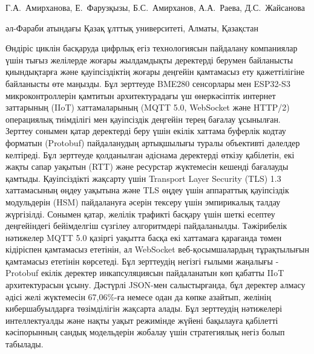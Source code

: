 
\begin{header}

Г.А.~Амирханова,
Е.~Фарузқызы\envelope,
Б.С.~Амирханов,
А.А.~Раева,
Д.С.~Жайсанова
\end{header}

\begin{affil}
әл-Фараби атындағы Қазақ ұлттық университеті, Алматы, Қазақстан

\end{affil}

Өндіріс циклін басқаруда цифрлық егіз технологиясын пайдалану
компаниялар үшін тығыз же\-лілерде жоғары жылдамдықты деректерді берумен
байланысты қиындықтарға және қауіпсіздіктің жоғары деңгейін қамтамасыз
ету қажеттілігіне байланысты өте маңызды. Бұл зерттеуде BME280
сенсорлары мен ESP32-S3 микроконтроллерін қамтитын архитектурадағы үш
өнеркәсіптік интернет заттарының (IIoT) хаттамаларының (MQTT 5.0,
WebSocket және HTTP/2) операциялық тиімділігі мен қауіпсіздік деңгейін
терең бағалау ұсынылған. Зерттеу сонымен қатар деректерді беру үшін
екілік хаттама буферлік кодтау форматын (Protobuf) пайдаланудың
артықшылығы туралы объективті дәлелдер келтіреді. Бұл зерттеуде
қолданылған әдіснама деректерді өткізу қабілетін, екі жақты сапар
уақытын (RTT) және ресурстар жүктемесін кешенді бағалауды қамтыды.
Қауіпсіздікті жақсарту үшін Transport Layer Security (TLS) 1.3
хаттамасының өңдеу уақытына және TLS өңдеу үшін аппараттық қауіпсіздік
модульдерін (HSM) пайдалануға әсерін тексеру үшін эмпирикалық талдау
жүргізілді. Сонымен қатар, желілік трафикті басқару үшін шеткі есептеу
деңгейіндегі бейімделгіш сүзгілеу алгоритмдері пайдаланылды. Тәжірибелік
нәтижелер MQTT 5.0 қазіргі уақытта басқа екі хаттамаға қарағанда төмен
кідіріспен қамтамасыз ететінін, ал WebSocket веб-қосымшалардың
тұрақтылығын қамтамасыз ететінін көрсетеді. Бұл зерттеудің негізгі
ғылыми жаңалығы - Protobuf екілік деректер инкапсуляциясын пайдаланатын
көп қабатты IIoT архитектурасын ұсыну. Дәстүрлі JSON-мен салыстырғанда,
бұл деректер алмасу әдісі желі жүктемесін 67,06\%-ға немесе одан да
көпке азайтып, желінің кибершабуылдарға төзімділігін жақсарта алады. Бұл
зерттеудің нәтижелері интеллектуалды және нақты уақыт режимінде жүйені
бақылауға қабілетті кәсіпорынның сандық модельдерін жобалау үшін
стратегиялық негіз болып табылады.

